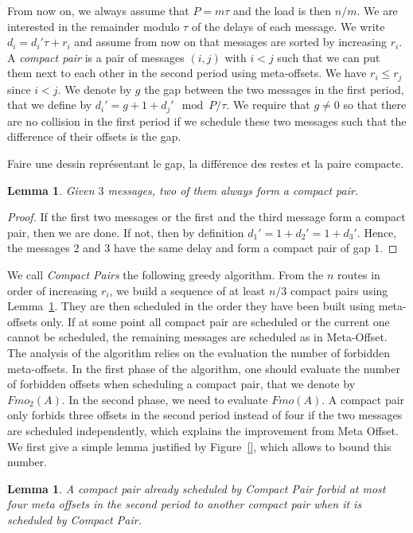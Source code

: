 \documentclass[10pt, conference, letterpaper]{IEEEtran}
\newtheorem{lemma}[theorem]{Lemma}
\begin{document}
From now on, we always assume that $P = m\tau$ and the load is then $n/m$.
We are interested in the remainder modulo $\tau$ of the delays of each message.
We write $d_i = d_{i}'\tau + r_i$ and assume from now on that messages are sorted by increasing $r_i$.
A \emph{compact pair} is a pair of messages $(i,j)$ with $i < j$ such that we can put them
next to each other in the second period using meta-offsets.
We have $r_i \leq r_j$ since $i < j$. We denote by $g$ the gap between the two messages in the first period, that we define by $d_{i}' = g + 1 + d_{j}' \mod P/\tau$. We require that $g \neq 0$ so that there are no collision in the first period if we schedule these two messages such that the difference of their offsets is the gap. 

Faire une dessin représentant le gap, la différence des restes et la paire compacte.

\begin{lemma}\label{lemma:pair_find}
Given $3$ messages, two of them always form a compact pair. 
\end{lemma}
\begin{proof}
If the first two messages or the first and the third message form a compact pair,
then we are done. If not, then by definition $d_{1}' = 1 + d_{2}' = 1 + d_{3}'$. Hence, the messages $2$ and $3$ have the same delay and form a compact pair of gap $1$.
\end{proof}

We call \emph{Compact Pairs} the following greedy algorithm. From the $n$ routes in order
of increasing $r_i$, we build a sequence of at least $n/3$ compact pairs using Lemma~\ref{lemma:pair_find}. They are then scheduled in the order they have been built using meta-offsets only. If at some point all compact pair are scheduled or the current one cannot be scheduled, the remaining messages are scheduled as in Meta-Offset. The analysis of the algorithm relies on the evaluation the number of forbidden meta-offsets. In the first phase
of the algorithm, one should evaluate the number of forbidden offsets when scheduling a compact pair, that we denote by $Fmo_2(A)$. In the second phase, we need to evaluate 
$Fmo(A)$. A compact pair only forbids three offsets in the second period instead of four if the two messages are scheduled independently, which explains the improvement from Meta Offset. We first give a simple lemma justified by Figure~\ref{}, which allows to bound this number.

\begin{lemma}\label{lemma:pair_forbid}
A compact pair already scheduled by Compact Pair forbid at most four meta offsets in the second period to another compact pair when it is scheduled by Compact Pair.
\end{lemma}
\end{document}
